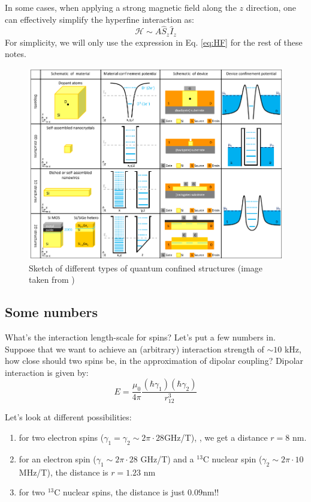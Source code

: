 \documentclass[a4paper,11pt]{article}
\begin{document}
In some cases, when applying a strong magnetic field along the $z$ direction, one can effectively simplify the hyperfine interaction as:
\begin{equation}
    \mathcal{H} \sim A \hat{S}_z \hat{I}_z
    \label {eq:HF}
\end{equation}
For simplicity, we will only use the expression in Eq. \ref{eq:HF} for the rest of these notes.

\begin{figure}[h]
\centering
\includegraphics[width = 1\textwidth]{figures/confined_structures_Si.png}
\caption{Sketch of different types of quantum confined structures (image taken from \cite{zwanenburg_silicon_2013})}
\label{fig:confined}
\end{figure}

\subsection{Some numbers}
What's the interaction length-scale for spins? Let's put a few numbers in. Suppose that we want to achieve an (arbitrary) interaction strength of $\sim 10$ kHz, how close should two spins be, in the approximation of dipolar coupling? Dipolar interaction is given by:
\begin{equation}
E = \frac{\mu_0}{4\pi}\frac{ (\hbar \gamma_1) (\hbar \gamma_2)}{r_{12}^3}    
\end{equation}

Let's look at different possibilities:
\begin{enumerate}
    \item for two electron spins ($\gamma_1 = \gamma_2 \sim 2\pi \cdot 28 $GHz/T), , we get a distance $r = 8$ nm.
    \item for an electron spin ($\gamma_1 \sim 2\pi \cdot 28$ GHz/T) and a $^{13}$C nuclear spin ($\gamma_2 \sim 2\pi \cdot 10$ MHz/T), the distance is $r = 1.23$ nm
    \item for two $^{13}$C nuclear spins, the distance is just $0.09$nm!! 
\end{enumerate}
\end{document}
